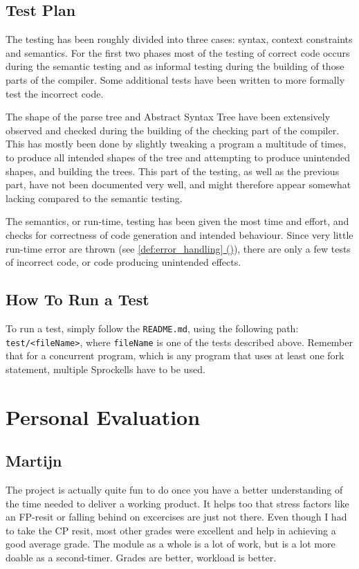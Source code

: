 \documentclass[twoside]{report}
\newcommand*{\fullref}[1]{\hyperref[{#1}]{\ref*{#1} (\nameref*{#1})}}
\begin{document}
\section{Test Plan}
The testing has been roughly divided into three cases: syntax, context constraints and semantics. For the first two phases most of the testing of correct code occurs during the semantic testing and as informal testing during the building of those parts of the compiler. Some additional tests have been written to more formally test the incorrect code.

The shape of the parse tree and Abstract Syntax Tree have been extensively observed and checked during the building of the checking part of the compiler. This has mostly been done by slightly tweaking a program a multitude of times, to produce all intended shapes of the tree and attempting to produce unintended shapes, and building the trees. This part of the testing, as well as the previous part, have not been documented very well, and might therefore appear somewhat lacking compared to the semantic testing.

The semantics, or run-time, testing has been given the most time and effort, and checks for correctness of code generation and intended behaviour. Since very little run-time error are thrown (see \fullref{def:error_handling}), there are only a few tests of incorrect code, or code producing unintended effects.


\section{How To Run a Test}
\label{how_to_run_a_test}
To run a test, simply follow the \texttt{README.md}, using the following path: \texttt{test/<fileName>}, where \texttt{fileName} is one of the tests described above. Remember that for a concurrent program, which is any program that uses at least one fork statement, multiple Sprockells have to be used.


\chapter{Personal Evaluation}
\label{personal_evaluation}
\section{Martijn}
The project is actually quite fun to do once you have a better understanding of the time needed to deliver a working product. It helps too that stress factors like an FP-resit or falling behind on excercises are just not there. Even though I had to take the CP resit, most other grades were excellent and help in achieving a good average grade. The module as a whole is a lot of work, but is a lot more doable as a second-timer. Grades are better, workload is better. 
\end{document}
